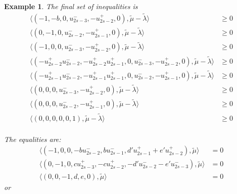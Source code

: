 \documentclass{amsart}
\newtheorem{example}[theorem]{Example}
\numberwithin{theorem}{section}
\begin{document}
\begin{example}
    The final set of inequalities is
    \begin{align*}
      \langle (-1,-b,0,u_{2s-3}^-,-u_{2s-2}^+,0), \tilde\mu - \tilde\lambda\rangle &\ge 0\\ 
      \langle (0,-1,0,u_{2s-2}^-,-u_{2s-1}^+,0), \tilde\mu - \tilde\lambda\rangle &\ge 0\\ 
      \langle (-1,0,0,u_{2s-3}^-,-u_{2s-2}^+,0), \tilde\mu - \tilde\lambda\rangle &\ge 0\\ 
      \langle (-u_{2s-2}^+u_{2s-2}^-,-u_{2s-2}^+u_{2s-1}^+,0,u_{2s-3}^-,-u_{2s-2}^+,0), \tilde\mu - \tilde\lambda\rangle &\ge 0\\ 
      \langle (-u_{2s-1}^+u_{2s-2}^-,-u_{2s-1}^+u_{2s-1}^+,0,u_{2s-2}^-,-u_{2s-1}^+,0), \tilde\mu - \tilde\lambda\rangle &\ge 0\\ 
      \langle (0,0,0,u_{2s-3}^-,-u_{2s-2}^+,0), \tilde\mu - \tilde\lambda\rangle &\ge 0\\ 
      \langle (0,0,0,u_{2s-2}^-,-u_{2s-1}^+,0), \tilde\mu - \tilde\lambda\rangle &\ge 0\\ 
      \langle (0,0,0,0,0,1), \tilde\mu - \tilde\lambda\rangle &\ge 0\\ 
    \end{align*}

    The equalities are:
    \begin{align*}
      \langle (-1,0,0, -b u_{2s-2}^-, b u_{2s-1}^-, d' u_{2s-1}^+ + e' u_{2s-2}^+), \tilde\mu \rangle &= 0\\
      \langle (0,-1,0, c u_{2s-3}^+, -c u_{2s-2}^+, -d' u_{2s-2}^- - e' u_{2s-3}^-), \tilde\mu \rangle &= 0\\
      \langle (0,0,-1, d, e, 0),\tilde\mu \rangle &= 0
    \end{align*}
    or
  \end{example}
\end{document}
